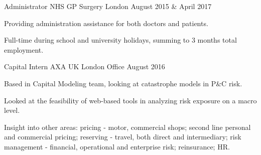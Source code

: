 

\begin{cventries}

%

  \cventry
    {Administrator} %
    {NHS GP Surgery} %
    {London} %
    {August 2015 \& April 2017} %
    {
      \begin{cvitems} %
        \item {Providing administration assistance for both doctors and patients.}
        \item{Full-time during school and university holidays, summing to 3 months total employment.}
      \end{cvitems}
    }
 
  \cventry
   {Capital Intern} %
   {AXA UK} %
   {London Office} %
   {August 2016} %
   {
     \begin{cvitems} %
       \item {Based in Capital Modeling team, looking at catastrophe models in P\&C risk.}
	\item{Looked at the feasibility of web-based tools in analyzing risk exposure on a macro level.}
	\item{Insight into other areas: pricing - motor, commercial shops; second line personal and commercial pricing; reserving - travel, both direct and intermediary; risk management - financial, operational and enterprise risk; reinsurance; HR.}
     \end{cvitems}
   }
     

\end{cventries}
